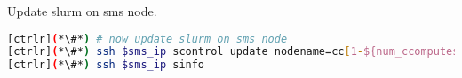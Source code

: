 Update slurm on sms node.

\begin{lstlisting}[language=bash,keywords={}]
[ctrlr](*\#*) # now update slurm on sms node
[ctrlr](*\#*) ssh $sms_ip scontrol update nodename=cc[1-${num_ccomputes}] state=idle
[ctrlr](*\#*) ssh $sms_ip sinfo
\end{lstlisting}
